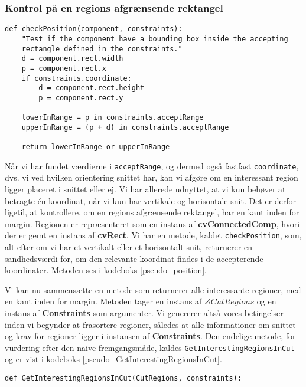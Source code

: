 {\subsubsection{Kontrol på en regions afgrænsende rektangel}
\begin{lstlisting}[caption={Metode, som kontrollerer, hvorvidt en region
    har en kant af det afgrænsende rektangel inden for margin.},
    captionpos=b, label={pseudo_position}, frame=tb, breaklines=false,
    float=t]
def checkPosition(component, constraints):
    "Test if the component have a bounding box inside the accepting
    rectangle defined in the constraints."
    d = component.rect.width
    p = component.rect.x
    if constraints.coordinate:
        d = component.rect.height
        p = component.rect.y

    lowerInRange = p in constraints.acceptRange
    upperInRange = (p + d) in constraints.acceptRange

    return lowerInRange or upperInRange
\end{lstlisting}
Når vi har fundet værdierne i \texttt{acceptRange}, og dermed også
fastfast \texttt{coordinate}, dvs. vi ved hvilken orientering snittet
har, kan vi afgøre om en interessant region ligger placeret i snittet
eller ej. Vi har allerede udnyttet, at vi kun behøver at betragte én
koordinat, når vi kun har vertikale og horisontale snit. Det er derfor
ligetil, at kontrollere, om en regions afgrænsende rektangel, har en
kant inden for margin. Regionen er repræsenteret som en instans af
\textbf{cvConnectedComp}, hvori der er gemt en instans af
\textbf{cvRect}. Vi har en metode, kaldet \texttt{checkPosition}, som,
alt efter om vi har et vertikalt eller et horisontalt snit, returnerer
en sandhedsværdi for, om den relevante koordinat findes i de
accepterende koordinater. Metoden ses i kodeboks \ref{pseudo_position}.

Vi kan nu sammensætte en metode som returnerer alle interessante
regioner, med en kant inden for margin. Metoden tager en instans af
$\angles{CutRegions}$ og en instans af \textbf{Constraints} som
argumenter. Vi genererer altså vores betingelser inden vi begynder at
frasortere regioner, således at alle informationer om snittet og krav
for regioner ligger i instansen af \textbf{Constraints}. Den endelige
metode, for vurdering efter den naive fremgangsmåde, kaldes
\texttt{GetInterestingRegionsInCut} og er vist i kodeboks
\ref{pseudo_GetInterestingRegionsInCut}.

\begin{lstlisting}[caption={Pseudokode, som returnerer alle interessante
    regioner, der har en kant, af deres afgrænsende rektangel, inden for
    margin.},
    captionpos=b, label={pseudo_GetInterestingRegionsInCut}, frame=tb, breaklines=false,
    float=hb]
def GetInterestingRegionsInCut(CutRegions, constraints):


\end{lstlisting}}
